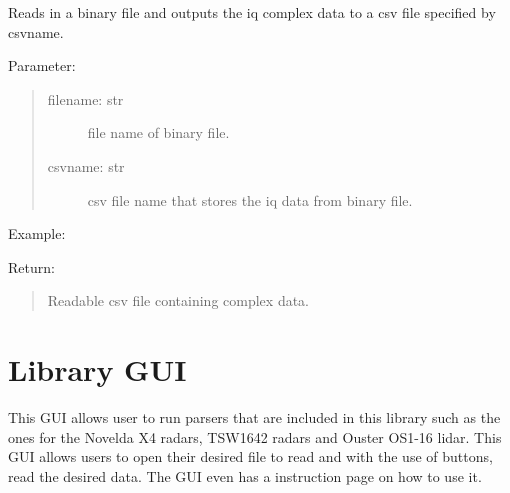 \documentclass[letterpaper,10pt,english]{sphinxmanual}
\begin{document}
\begin{fulllineitems}
\label{\detokenize{TSW radar:TSW_IWR.readTSWdata}}
Reads in a binary file and outputs the iq complex data to a csv file specified by csvname.

Parameter:
\begin{quote}
\begin{description}
\item[{filename: str}] \leavevmode
file name of binary file.

\item[{csvname: str}] \leavevmode
csv file name that stores the iq data from binary file.

\end{description}
\end{quote}

Example:

\begin{sphinxVerbatim}[commandchars=\\\{\}]
\end{sphinxVerbatim}

Return:
\begin{quote}

Readable csv file containing complex data.
\end{quote}

\end{fulllineitems}



\section{Library GUI}
\label{\detokenize{Library GUI:library-gui}}\label{\detokenize{Library GUI::doc}}
This GUI allows user to run parsers that are included in this library such as the ones for the Novelda X4 radars, TSW1642 radars and Ouster OS1-16 lidar. This GUI allows users to
open their desired file to read and with the use of buttons, read the desired data. The GUI even has a instruction page on how to use it.
\end{document}
